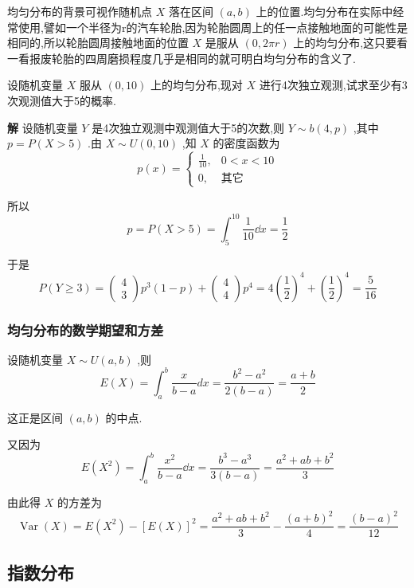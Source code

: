 均匀分布的背景可视作随机点 $ X $ 落在区间 $ (a,b) $ 上的位置.均匀分布在实际中经常使用,譬如一个半径为r的汽车轮胎,因为轮胎圆周上的任一点接触地面的可能性是相同的,所以轮胎圆周接触地面的位置 $ X $ 是服从 $ (0,2 \pi r) $ 上的均匀分布,这只要看一看报废轮胎的四周磨损程度几乎是相同的就可明白均匀分布的含义了.

\begin{example}\label{exam:2.5.4}
	设随机变量 $ X $ 服从 $ (0,10) $ 上的均匀分布,现对 $ X $ 进行4次独立观测,试求至少有3次观测值大于5的概率.
	
	\textbf{解} 设随机变量 $ Y $ 是4次独立观测中观测值大于5的次数,则 $ Y \sim b(4, p) $ ,其中 $ p=P(X>5) $ .由 $ X \sim U(0,10) $ ,知 $ X $ 的密度函数为
	\[
	p(x)=\left\{
	\begin{array}{ll}
	{\frac{1}{10},} & {0<x<10} \\ 
	{0,}            & {\text{其它}}
	\end{array}\right.
	\]
	
	所以
	\[
	p=P(X>5)=\int_{5}^{10} \frac{1}{10} \dd x=\frac{1}{2}
	\]
	
	于是
	\[
	P(Y \geqslant 3)=\left( \begin{array}{l}{4} \\ {3}\end{array}\right) p^{3}(1-p)+\left( \begin{array}{l}{4} \\ {4}\end{array}\right) p^{4}=4\left(\frac{1}{2}\right)^{4}+\left(\frac{1}{2}\right)^{4}=\frac{5}{16}
	\]
\end{example}

\subsubsection{均匀分布的数学期望和方差}

设随机变量 $ X \sim U(a, b) $ ,则
\[
E(X)=\int_{a}^{b} \frac{x}{b-a} d x=\frac{b^{2}-a^{2}}{2(b-a)}=\frac{a+b}{2}
\]

这正是区间 $ (a,b) $ 的中点.

又因为
\[
E\left(X^{2}\right)=\int_{a}^{b} \frac{x^{2}}{b-a} \dd x=\frac{b^{3}-a^{3}}{3(b-a)}=\frac{a^{2}+a b+b^{2}}{3}
\]

由此得 $ X $ 的方差为
\[
\operatorname{Var}(X)=E\left(X^{2}\right)-[E(X)]^{2}=\frac{a^{2}+a b+b^{2}}{3}-\frac{(a+b)^{2}}{4}=\frac{(b-a)^{2}}{12}
\]

\subsection{指数分布}\label{ssec:2.5.3}

